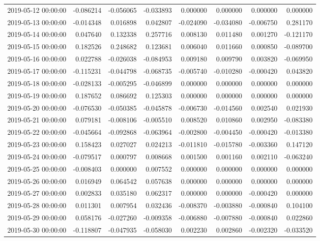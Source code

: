 \begin{tabular}{lrrrrrrr}
2019-05-12 00:00:00 & -0.086214 & -0.056065 & -0.033893 & 0.000000 & 0.000000 & 0.000000 & 0.000000 \\
2019-05-13 00:00:00 & -0.014348 & 0.016898 & 0.042807 & -0.024090 & -0.034080 & -0.006750 & 0.281170 \\
2019-05-14 00:00:00 & 0.047640 & 0.132338 & 0.257716 & 0.008130 & 0.011480 & 0.001270 & -0.121170 \\
2019-05-15 00:00:00 & 0.182526 & 0.248682 & 0.123681 & 0.006040 & 0.011660 & 0.000850 & -0.089700 \\
2019-05-16 00:00:00 & 0.022788 & -0.026038 & -0.084953 & 0.009180 & 0.009790 & 0.003820 & -0.069950 \\
2019-05-17 00:00:00 & -0.115231 & -0.044798 & -0.068735 & -0.005740 & -0.010280 & -0.000420 & 0.043820 \\
2019-05-18 00:00:00 & -0.028133 & -0.005295 & -0.046899 & 0.000000 & 0.000000 & 0.000000 & 0.000000 \\
2019-05-19 00:00:00 & 0.187652 & 0.086692 & 0.125303 & 0.000000 & 0.000000 & 0.000000 & 0.000000 \\
2019-05-20 00:00:00 & -0.076530 & -0.050385 & -0.045878 & -0.006730 & -0.014560 & 0.002540 & 0.021930 \\
2019-05-21 00:00:00 & 0.079181 & -0.008106 & -0.005510 & 0.008520 & 0.010860 & 0.002950 & -0.083380 \\
2019-05-22 00:00:00 & -0.045664 & -0.092868 & -0.063964 & -0.002800 & -0.004450 & -0.000420 & -0.013380 \\
2019-05-23 00:00:00 & 0.158423 & 0.027027 & 0.024213 & -0.011810 & -0.015780 & -0.003360 & 0.147120 \\
2019-05-24 00:00:00 & -0.079517 & 0.000797 & 0.008668 & 0.001500 & 0.001160 & 0.002110 & -0.063240 \\
2019-05-25 00:00:00 & -0.008403 & 0.000000 & 0.007552 & 0.000000 & 0.000000 & 0.000000 & 0.000000 \\
2019-05-26 00:00:00 & 0.016949 & 0.064542 & 0.057638 & 0.000000 & 0.000000 & 0.000000 & 0.000000 \\
2019-05-27 00:00:00 & 0.002833 & 0.035180 & 0.062317 & 0.000000 & 0.000000 & -0.000420 & 0.000000 \\
2019-05-28 00:00:00 & 0.011301 & 0.007954 & 0.032436 & -0.008370 & -0.003880 & -0.000840 & 0.104100 \\
2019-05-29 00:00:00 & 0.058176 & -0.027260 & -0.009358 & -0.006880 & -0.007880 & -0.000840 & 0.022860 \\
2019-05-30 00:00:00 & -0.118807 & -0.047935 & -0.058030 & 0.002230 & 0.002860 & -0.002320 & -0.033520 \\

\end{tabular}
